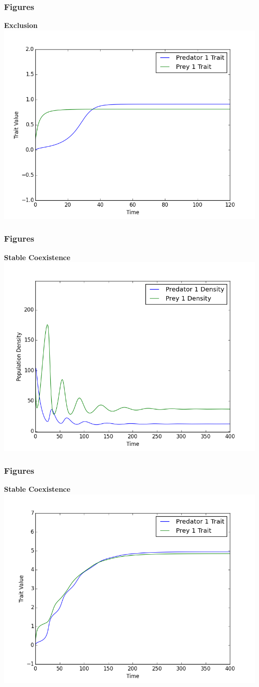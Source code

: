 \documentclass[10pt]{beamer}
\begin{document}
\begin{frame}
	\frametitle{Figures}
	{\bf Exclusion}
	\includegraphics[scale=0.5]{traits_1.png}
\end{frame}
\begin{frame}
	\frametitle{Figures}
	{\bf Stable Coexistence}
	\includegraphics[scale=0.5]{densities_2.png}
\end{frame}
\begin{frame}
	\frametitle{Figures}
	{\bf Stable Coexistence}
	\includegraphics[scale=0.5]{traits_2.png}
\end{frame}
\end{document}
